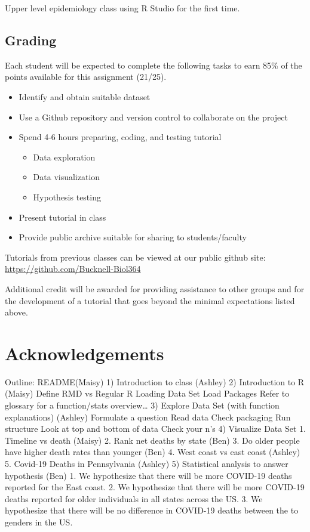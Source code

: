\documentclass[
]{article}
\providecommand{\tightlist}{%
  \setlength{\itemsep}{0pt}\setlength{\parskip}{0pt}}
\begin{document}
Upper level epidemiology class using R Studio for the first time.

\hypertarget{grading}{%
\subsection{Grading}\label{grading}}

Each student will be expected to complete the following tasks to earn
85\% of the points available for this assignment (21/25).

\begin{itemize}
\tightlist
\item
  Identify and obtain suitable dataset
\item
  Use a Github repository and version control to collaborate on the
  project
\item
  Spend 4-6 hours preparing, coding, and testing tutorial

  \begin{itemize}
  \tightlist
  \item
    Data exploration
  \item
    Data visualization
  \item
    Hypothesis testing
  \end{itemize}
\item
  Present tutorial in class
\item
  Provide public archive suitable for sharing to students/faculty
\end{itemize}

Tutorials from previous classes can be viewed at our public github site:
\url{https://github.com/Bucknell-Biol364}

Additional credit will be awarded for providing assistance to other
groups and for the development of a tutorial that goes beyond the
minimal expectations listed above.

\hypertarget{acknowledgements}{%
\section{Acknowledgements}\label{acknowledgements}}

Outline: README(Maisy) 1) Introduction to class (Ashley) 2) Introduction
to R (Maisy) Define RMD vs Regular R Loading Data Set Load Packages
Refer to glossary for a function/stats overview\ldots{} 3) Explore Data
Set (with function explanations) (Ashley) Formulate a question Read data
Check packaging Run structure Look at top and bottom of data Check your
n's 4) Visualize Data Set 1. Timeline vs death (Maisy) 2. Rank net
deaths by state (Ben) 3. Do older people have higher death rates than
younger (Ben) 4. West coast vs east coast (Ashley) 5. Covid-19 Deaths in
Pennsylvania (Ashley) 5) Statistical analysis to answer hypothesis (Ben)
1. We hypothesize that there will be more COVID-19 deaths reported for
the East coast. 2. We hypothesize that there will be more COVID-19
deaths reported for older individuals in all states across the US. 3. We
hypothesize that there will be no difference in COVID-19 deaths between
the to genders in the US.
\end{document}
